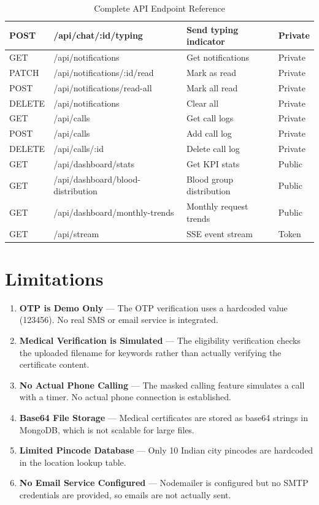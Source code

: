 \documentclass[12pt,a4paper]{article}
\begin{document}
\begin{table}[H]
\begin{tabularx}{\textwidth}{|l|l|X|l|}
    \hline
    POST & /api/chat/:id/typing & Send typing indicator & Private \\
    \hline
    GET & /api/notifications & Get notifications & Private \\
    \hline
    PATCH & /api/notifications/:id/read & Mark as read & Private \\
    \hline
    POST & /api/notifications/read-all & Mark all read & Private \\
    \hline
    DELETE & /api/notifications & Clear all & Private \\
    \hline
    GET & /api/calls & Get call logs & Private \\
    \hline
    POST & /api/calls & Add call log & Private \\
    \hline
    DELETE & /api/calls/:id & Delete call log & Private \\
    \hline
    GET & /api/dashboard/stats & Get KPI stats & Public \\
    \hline
    GET & /api/dashboard/blood-distribution & Blood group distribution & Public \\
    \hline
    GET & /api/dashboard/monthly-trends & Monthly request trends & Public \\
    \hline
    GET & /api/stream & SSE event stream & Token \\
    \hline
\end{tabularx}
\caption{Complete API Endpoint Reference}
\end{table}

\section{Limitations}

\begin{enumerate}[leftmargin=*]
    \item \textbf{OTP is Demo Only} --- The OTP verification uses a hardcoded value (123456). No real SMS or email service is integrated.
    \item \textbf{Medical Verification is Simulated} --- The eligibility verification checks the uploaded filename for keywords rather than actually verifying the certificate content.
    \item \textbf{No Actual Phone Calling} --- The masked calling feature simulates a call with a timer. No actual phone connection is established.
    \item \textbf{Base64 File Storage} --- Medical certificates are stored as base64 strings in MongoDB, which is not scalable for large files.
    \item \textbf{Limited Pincode Database} --- Only 10 Indian city pincodes are hardcoded in the location lookup table.
    \item \textbf{No Email Service Configured} --- Nodemailer is configured but no SMTP credentials are provided, so emails are not actually sent.
\end{enumerate}
\end{document}
